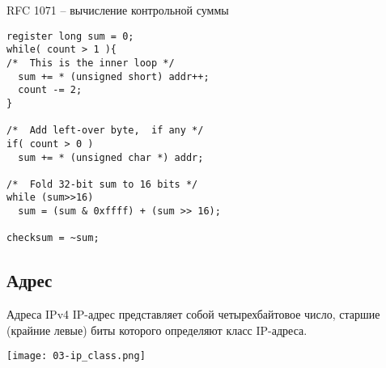 \begin{frame}[fragile]{RFC 1071 -- вычисление контрольной суммы}
	\scriptsize	
\begin{lstlisting}[Language=C]
register long sum = 0;
while( count > 1 ){
/*  This is the inner loop */
  sum += * (unsigned short) addr++;
  count -= 2;
}

/*  Add left-over byte,  if any */
if( count > 0 )
  sum += * (unsigned char *) addr;

/*  Fold 32-bit sum to 16 bits */
while (sum>>16)
  sum = (sum & 0xffff) + (sum >> 16);

checksum = ~sum;
\end{lstlisting}
	\normalsize
\end{frame}

\subsection{Адрес}
\begin{frame}{Адреса IPv4}
IP-адрес представляет собой четырехбайтовое число,  старшие (крайние левые) биты которого определяют класс IP-адреса.
	\begin{center}
		\texttt{[image: 03-ip\_class.png]}
	\end{center}

\end{frame}

